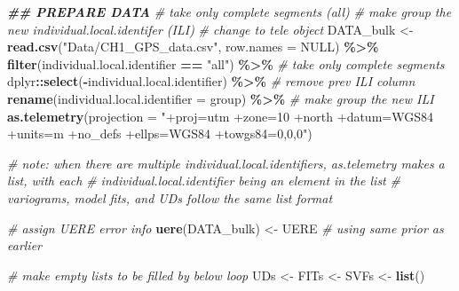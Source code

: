 \documentclass[
]{article}
\newenvironment{Shaded}{\begin{snugshade}}{\end{snugshade}}
\newcommand{\AttributeTok}[1]{\textcolor[rgb]{0.13,0.29,0.53}{#1}}
\newcommand{\CommentTok}[1]{\textcolor[rgb]{0.56,0.35,0.01}{\textit{#1}}}
\newcommand{\ConstantTok}[1]{\textcolor[rgb]{0.56,0.35,0.01}{#1}}
\newcommand{\DocumentationTok}[1]{\textcolor[rgb]{0.56,0.35,0.01}{\textbf{\textit{#1}}}}
\newcommand{\FunctionTok}[1]{\textcolor[rgb]{0.13,0.29,0.53}{\textbf{#1}}}
\newcommand{\NormalTok}[1]{#1}
\newcommand{\OtherTok}[1]{\textcolor[rgb]{0.56,0.35,0.01}{#1}}
\newcommand{\SpecialCharTok}[1]{\textcolor[rgb]{0.81,0.36,0.00}{\textbf{#1}}}
\newcommand{\StringTok}[1]{\textcolor[rgb]{0.31,0.60,0.02}{#1}}
\begin{document}
\begin{Shaded}
\begin{Highlighting}[]
\DocumentationTok{\#\# PREPARE DATA }
\CommentTok{\# take only complete segments (all)}
\CommentTok{\# make group the new individual.local.identifer (ILI)}
\CommentTok{\# change to tele object}
\NormalTok{DATA\_bulk }\OtherTok{\textless{}{-}} \FunctionTok{read.csv}\NormalTok{(}\StringTok{"Data/CH1\_GPS\_data.csv"}\NormalTok{, }\AttributeTok{row.names =} \ConstantTok{NULL}\NormalTok{) }\SpecialCharTok{\%\textgreater{}\%} 
  \FunctionTok{filter}\NormalTok{(individual.local.identifier }\SpecialCharTok{==} \StringTok{"all"}\NormalTok{) }\SpecialCharTok{\%\textgreater{}\%} \CommentTok{\# take only complete segments}
\NormalTok{  dplyr}\SpecialCharTok{::}\FunctionTok{select}\NormalTok{(}\SpecialCharTok{{-}}\NormalTok{individual.local.identifier) }\SpecialCharTok{\%\textgreater{}\%} \CommentTok{\# remove prev ILI column}
  \FunctionTok{rename}\NormalTok{(}\AttributeTok{individual.local.identifier =}\NormalTok{ group) }\SpecialCharTok{\%\textgreater{}\%} \CommentTok{\# make group the new ILI}
  \FunctionTok{as.telemetry}\NormalTok{(}\AttributeTok{projection =} \StringTok{"+proj=utm +zone=10 +north +datum=WGS84 +units=m +no\_defs +ellps=WGS84 +towgs84=0,0,0"}\NormalTok{)}

\CommentTok{\# note: when there are multiple individual.local.identifiers, as.telemetry makes a list, with each}
\CommentTok{\# individual.local.identifier being an element in the list}
\CommentTok{\# variograms, model fits, and UDs follow the same list format}

\CommentTok{\# assign UERE error info}
\FunctionTok{uere}\NormalTok{(DATA\_bulk) }\OtherTok{\textless{}{-}}\NormalTok{ UERE }\CommentTok{\# using same prior as earlier}

\CommentTok{\# make empty lists to be filled by below loop}
\NormalTok{UDs }\OtherTok{\textless{}{-}}\NormalTok{ FITs }\OtherTok{\textless{}{-}}\NormalTok{ SVFs }\OtherTok{\textless{}{-}} \FunctionTok{list}\NormalTok{()}


\end{Highlighting}
\end{Shaded}
\end{document}
